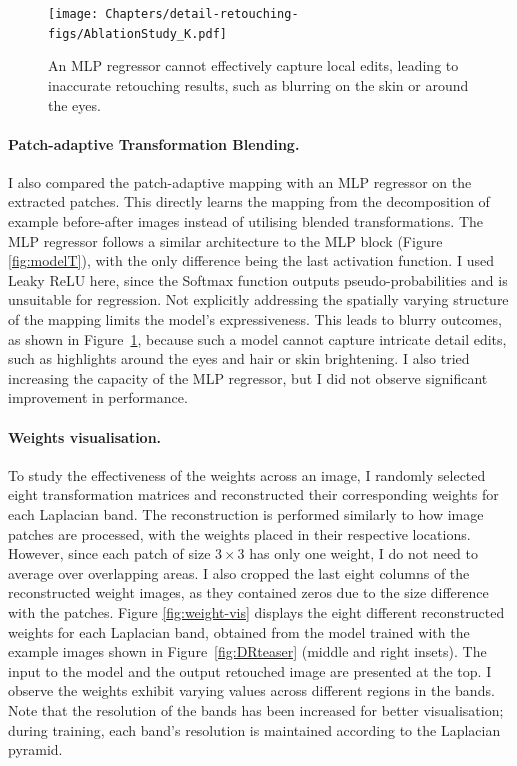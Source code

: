 \begin{figure}%
\centering
\texttt{[image: Chapters/detail-retouching-figs/AblationStudy\_K.pdf]}
    \caption{An MLP regressor cannot effectively capture local edits, leading to inaccurate retouching results, such as blurring on the skin or around the eyes.}

\label{fig:ablation_MLP}
\end{figure}
\paragraph{Patch-adaptive Transformation Blending.} I also compared the patch-adaptive mapping with an \gls{MLP} regressor on the extracted patches. This directly learns the mapping from the decomposition of example before-after images instead of utilising blended transformations. The \gls{MLP} regressor follows a similar architecture to the \gls{MLP} block (Figure \ref{fig:modelT}), with the only difference being the last activation function. I used Leaky \gls{ReLU} here, since the Softmax function outputs pseudo-probabilities and is unsuitable for regression. Not explicitly addressing the spatially varying structure of the mapping limits the model’s expressiveness. This leads to blurry outcomes, as shown in Figure~\ref{fig:ablation_MLP}, because such a model cannot capture intricate detail edits, such as highlights around the eyes and hair or skin brightening. I also tried increasing the capacity of the \gls{MLP} regressor, but I did not observe significant improvement in performance.


\paragraph{Weights visualisation.} To study the effectiveness of the weights across an image, I randomly selected eight transformation matrices and reconstructed their corresponding weights for each Laplacian band. The reconstruction is performed similarly to how image patches are processed, with the weights placed in their respective locations. However, since each patch of size $3 \times 3$ has only one weight, I do not need to average over overlapping areas. I also cropped the last eight columns of the reconstructed weight images, as they contained zeros due to the size difference with the patches. Figure \ref{fig:weight-vis} displays the eight different reconstructed weights for each Laplacian band, obtained from the model trained with the example images shown in Figure~\ref{fig:DRteaser} (middle and right insets). The input to the model and the output retouched image are presented at the top. I observe the weights exhibit varying values across different regions in the bands. Note that the resolution of the bands has been increased for better visualisation; during training, each band’s resolution is maintained according to the Laplacian pyramid.


